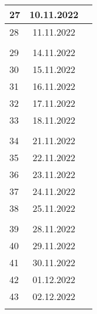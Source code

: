 \begin{longtable}{|l|c|l|}
27  & 10.11.2022    &                                                       \\ \hline   
28  & 11.11.2022    &                                                    \\ \hline  
&               &                                                       \\ \hline 
29  & 14.11.2022    &                                                       \\ \hline   
30  & 15.11.2022    &                                                       \\ \hline   
31  & 16.11.2022    &                                                       \\ \hline   
32  & 17.11.2022    &                                                       \\ \hline   
33  & 18.11.2022    &                                                       \\ \hline
&               &                                                       \\ \hline 
34  & 21.11.2022    &                                                       \\ \hline 
35  & 22.11.2022    &                                                       \\ \hline   
36  & 23.11.2022    &                                                       \\ \hline   
37  & 24.11.2022    &                                                       \\ \hline   
38  & 25.11.2022    &                                                       \\ \hline 
&               &                                                       \\ \hline   
39  & 28.11.2022    &                                                       \\ \hline   
40  & 29.11.2022    &                                                       \\ \hline   
41  & 30.11.2022    &                                                       \\ \hline   
42  & 01.12.2022    &                                                       \\ \hline   
43  & 02.12.2022    &                                                       \\ \hline  
&               &                                                       \\ \hline  

\end{longtable}
